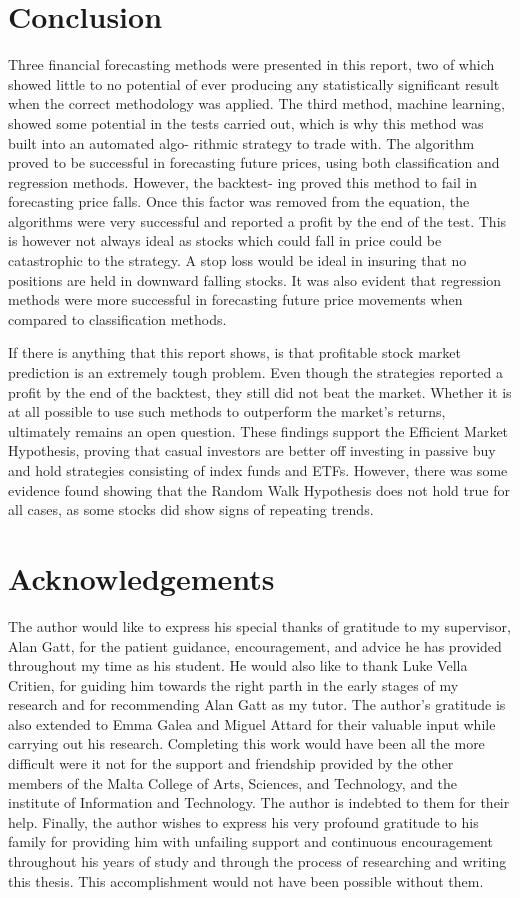 \documentclass[times]{jtitauth}
\begin{document}
\section{Conclusion}
Three financial forecasting methods were presented in this report, two of which showed little to no potential of ever producing any statistically significant result when the correct methodology was applied. The third method, machine learning, showed some potential in the tests carried out, which is why this method was built into an automated algo- rithmic strategy to trade with. The algorithm proved to be successful in forecasting future prices, using both classification and regression methods. However, the backtest- ing proved this method to fail in forecasting price falls. Once this factor was removed from the equation, the algorithms were very successful and reported a profit by the end of the test. This is however not always ideal as stocks which could fall in price could be catastrophic to the strategy. A stop loss would be ideal in insuring that no positions are held in downward falling stocks. It was also evident that regression methods were more successful in forecasting future price movements when compared to classification methods.

If there is anything that this report shows, is that profitable stock market prediction is an extremely tough problem. Even though the strategies reported a profit by the end of the backtest, they still did not beat the market. Whether it is at all possible to use such methods to outperform the market’s returns, ultimately remains an open question. These findings support the Efficient Market Hypothesis, proving that casual investors are better off investing in passive buy and hold strategies consisting of index funds and ETFs. However, there was some evidence found showing that the Random Walk Hypothesis does not hold true for all cases, as some stocks did show signs of repeating trends.

\section*{Acknowledgements}

The author would like to express his special thanks of gratitude to my supervisor, Alan Gatt, for the patient guidance, encouragement, and advice he has provided throughout my time as his student. He would also like to thank Luke Vella Critien, for guiding him towards the right parth in the early stages of my research and for recommending Alan Gatt as my tutor. The author's gratitude is also extended to Emma Galea and Miguel Attard for their valuable input while carrying out his research. Completing this work would have been all the more difficult were it not for the support and friendship provided by the other members of the Malta College of Arts, Sciences, and Technology, and the institute of Information and Technology. The author is indebted to them for their help. Finally, the author wishes to express his very profound gratitude to his family for providing him with unfailing support and continuous encouragement throughout his years of study and through the process of researching and writing this thesis. This accomplishment would not have been possible without them. 
\end{document}

